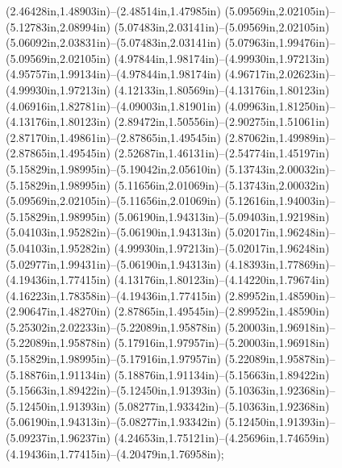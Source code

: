 (2.46428in,1.48903in)--(2.48514in,1.47985in) (5.09569in,2.02105in)--(5.12783in,2.08994in) (5.07483in,2.03141in)--(5.09569in,2.02105in) (5.06092in,2.03831in)--(5.07483in,2.03141in) (5.07963in,1.99476in)--(5.09569in,2.02105in) (4.97844in,1.98174in)--(4.99930in,1.97213in) (4.95757in,1.99134in)--(4.97844in,1.98174in) (4.96717in,2.02623in)--(4.99930in,1.97213in) (4.12133in,1.80569in)--(4.13176in,1.80123in) (4.06916in,1.82781in)--(4.09003in,1.81901in) (4.09963in,1.81250in)--(4.13176in,1.80123in) (2.89472in,1.50556in)--(2.90275in,1.51061in) (2.87170in,1.49861in)--(2.87865in,1.49545in) (2.87062in,1.49989in)--(2.87865in,1.49545in) (2.52687in,1.46131in)--(2.54774in,1.45197in) (5.15829in,1.98995in)--(5.19042in,2.05610in) (5.13743in,2.00032in)--(5.15829in,1.98995in) (5.11656in,2.01069in)--(5.13743in,2.00032in) (5.09569in,2.02105in)--(5.11656in,2.01069in) (5.12616in,1.94003in)--(5.15829in,1.98995in) (5.06190in,1.94313in)--(5.09403in,1.92198in) (5.04103in,1.95282in)--(5.06190in,1.94313in) (5.02017in,1.96248in)--(5.04103in,1.95282in) (4.99930in,1.97213in)--(5.02017in,1.96248in) (5.02977in,1.99431in)--(5.06190in,1.94313in) (4.18393in,1.77869in)--(4.19436in,1.77415in) (4.13176in,1.80123in)--(4.14220in,1.79674in) (4.16223in,1.78358in)--(4.19436in,1.77415in) (2.89952in,1.48590in)--(2.90647in,1.48270in) (2.87865in,1.49545in)--(2.89952in,1.48590in) (5.25302in,2.02233in)--(5.22089in,1.95878in) (5.20003in,1.96918in)--(5.22089in,1.95878in) (5.17916in,1.97957in)--(5.20003in,1.96918in) (5.15829in,1.98995in)--(5.17916in,1.97957in) (5.22089in,1.95878in)--(5.18876in,1.91134in) (5.18876in,1.91134in)--(5.15663in,1.89422in) (5.15663in,1.89422in)--(5.12450in,1.91393in) (5.10363in,1.92368in)--(5.12450in,1.91393in) (5.08277in,1.93342in)--(5.10363in,1.92368in) (5.06190in,1.94313in)--(5.08277in,1.93342in) (5.12450in,1.91393in)--(5.09237in,1.96237in) (4.24653in,1.75121in)--(4.25696in,1.74659in) (4.19436in,1.77415in)--(4.20479in,1.76958in);
